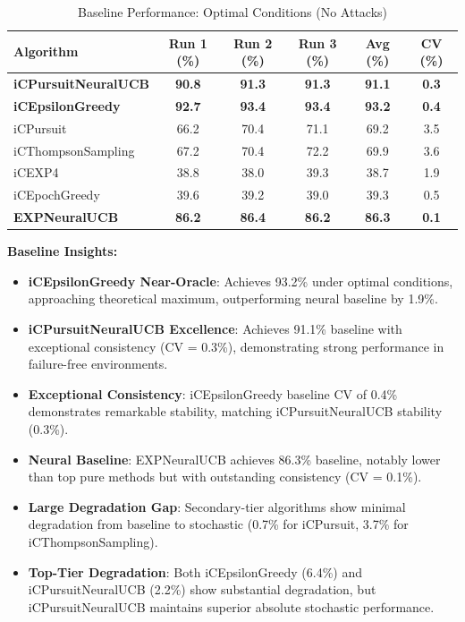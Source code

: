 \documentclass[12pt,a4paper]{article}
\newcommand{\primarytext}[1]{\textcolor{primaryblue}{\textbf{#1}}}
\newcommand{\secondarytext}[1]{\textcolor{secondaryblue}{\textbf{#1}}}
\newcommand{\warning}[1]{\textcolor{warningred}{\textbf{#1}}}
\newcommand{\legacy}[1]{\textcolor{legacycolor}{\textbf{#1}}}
\newcommand{\neural}[1]{\textcolor{neuralcolor}{\textbf{#1}}}
\begin{document}
\begin{table}[H]
\centering
\caption{Baseline Performance: Optimal Conditions (No Attacks)}
\label{tab:baseline-performance}
\begin{tabular}{@{}lccccc@{}}
\toprule
\textbf{Algorithm} & \textbf{Run 1 (\%)} & \textbf{Run 2 (\%)} & \textbf{Run 3 (\%)} & \textbf{Avg (\%)} & \textbf{CV (\%)} \\
\midrule
\neural{iCPursuitNeuralUCB}   & \neural{90.8} & \neural{91.3} & \neural{91.3} & \neural{91.1} & \neural{0.3} \\
\primarytext{iCEpsilonGreedy}   & \primarytext{92.7} & \primarytext{93.4} & \primarytext{93.4} & \primarytext{93.2} & \primarytext{0.4} \\
iCPursuit                       & 66.2 & 70.4 & 71.1 & 69.2 & 3.5 \\
iCThompsonSampling              & 67.2 & 70.4 & 72.2 & 69.9 & 3.6 \\
iCEXP4                          & 38.8 & 38.0 & 39.3 & 38.7 & 1.9 \\
iCEpochGreedy                   & 39.6 & 39.2 & 39.0 & 39.3 & 0.5 \\
\legacy{EXPNeuralUCB}           & \legacy{86.2} & \legacy{86.4} & \legacy{86.2} & \legacy{86.3} & \legacy{0.1} \\
\bottomrule
\end{tabular}
\end{table}

\textbf{Baseline Insights:}
\begin{itemize}
\item \primarytext{iCEpsilonGreedy Near-Oracle}: Achieves 93.2\% under optimal conditions, approaching theoretical maximum, outperforming neural baseline by 1.9\%.
\item \neural{iCPursuitNeuralUCB Excellence}: Achieves 91.1\% baseline with exceptional consistency (CV = 0.3\%), demonstrating strong performance in failure-free environments.
\item \primarytext{Exceptional Consistency}: iCEpsilonGreedy baseline CV of 0.4\% demonstrates remarkable stability, matching iCPursuitNeuralUCB stability (0.3\%).
\item \legacy{Neural Baseline}: EXPNeuralUCB achieves 86.3\% baseline, notably lower than top pure methods but with outstanding consistency (CV = 0.1\%).
\item \secondarytext{Large Degradation Gap}: Secondary-tier algorithms show minimal degradation from baseline to stochastic (0.7\% for iCPursuit, 3.7\% for iCThompsonSampling).
\item \warning{Top-Tier Degradation}: Both iCEpsilonGreedy (6.4\%) and iCPursuitNeuralUCB (2.2\%) show substantial degradation, but iCPursuitNeuralUCB maintains superior absolute stochastic performance.
\end{itemize}
\end{document}
